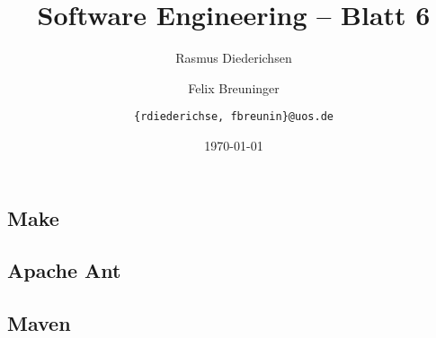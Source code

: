 \documentclass{scrartcl}
\title{\rmfamily Software Engineering -- Blatt 6}
\author{Rasmus Diederichsen \and Felix Breuninger\and 
   \texttt{\{rdiederichse, fbreunin\}@uos.de}
}
\date{\today}
\begin{document}
\selectfont
\maketitle

\setcounter{section}{6}
\setcounter{subsection}{0}

\subsection{Make}

\subsection{Apache Ant}

\subsection{Maven}
\end{document}
